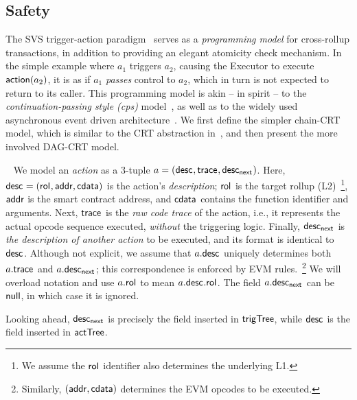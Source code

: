 \subsection{Safety}
The SVS trigger-action paradigm~\cite{shared-val-seq-23} serves as a \emph{programming model} for cross-rollup transactions, in addition to providing an elegant atomicity check mechanism. In the simple example where $a_1$ triggers $a_2$, causing the Executor to execute $\mathsf{action}{}(a_2)$, it is as if $a_1$ \emph{passes} control to $a_2$, which in turn is not expected to return to its caller. This programming model is akin -- in spirit -- to the \emph{continuation-passing style (cps)} model~\cite{sussman-scheme-1998, appel-continuations-2007}, as well as to the widely used asynchronous event driven architecture~\cite{jansen-ibm-event-driven-2020, rah-even-driven-microservices-2022, ghaemi-pubsub-blockchain-2021}. 
We first define the simpler chain-CRT model, which is similar to the CRT abstraction in~\cite{lu-atomic-cc-interactions-24}, and then present the more involved DAG-CRT model.


~\label{sec:chain-crt-model}
We model an \emph{action} as a $3$-tuple $a = (\mathsf{desc}_{}, \mathsf{trace}_{}, \mathsf{desc_{next}}_{})$. Here, $\mathsf{desc}_{} = (\mathsf{rol}_{}, \mathsf{addr}{}, \mathsf{cdata}{})$ is the action's \emph{description}; $\mathsf{rol}_{}$ is the target rollup (L2)~\footnote{We assume the $\mathsf{rol}_{}$ identifier also determines the underlying L1.}, $\mathsf{addr}$ is the smart contract address, and $\mathsf{cdata}$ contains the function identifier and arguments.
Next, $\mathsf{trace}_{}$ is the \emph{raw code trace} of the action, i.e., it represents the actual opcode sequence executed, \emph{without} the triggering logic. Finally, $\mathsf{desc_{next}}_{}$ is \emph{the description of another action} to be executed, and its format is identical to $\mathsf{desc}_{}$. Although not explicit, we assume that $a.\mathsf{desc}_{}$ uniquely determines both $a.\mathsf{trace}_{}$ and $a.\mathsf{desc_{next}}_{}$; this correspondence is enforced by EVM rules.~\footnote{Similarly, $(\mathsf{addr}{}, \mathsf{cdata}{})$ determines the EVM opcodes to be executed.} We will overload notation and use $a.\mathsf{rol}_{}$ to mean $a.\mathsf{desc}_{}.\mathsf{rol}_{}$. The field $a.\mathsf{desc_{next}}_{}$ can be $\mathsf{null}$, in which case it is ignored.


\begin{remark}
    Looking ahead, $\mathsf{desc_{next}}_{}$ is precisely the field inserted in $\mathsf{trigTree}$, while $\mathsf{desc}_{}$ is the field inserted in $\mathsf{actTree}$.  
\end{remark}


